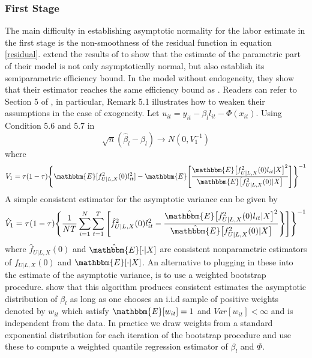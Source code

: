 \documentclass[11pt]{article}
\begin{document}
\subsubsection*{First Stage}
The main difficulty in establishing asymptotic normality for the labor estimate in the first stage is the non-smoothness of the residual function in equation \eqref{residual}. \cite{Chen2009} extend the results of \cite{Ai2003} to show that the estimate of the parametric part of their model is not only asymptotically normal, but also establish its semiparametric efficiency bound. In the model without endogeneity, they show that their estimator reaches the same efficiency bound as \cite{Lee2003}. Readers can refer to Section 5 of \cite{Chen2009}, in particular, Remark 5.1 illustrates how to weaken their assumptions in the case of exogeneity. Let $u_{it}=y_{it}-\beta_{l}l_{it}-\Phi(x_{it})$. Using Condition 5.6 and 5.7 in \cite{Chen2009}
\begin{equation}
\sqrt{n}(\hat{\beta}_{l}-\beta_{l})\rightarrow N(0, V_{1}^{-1})
\end{equation}
where
\begin{equation}
V_{1}=\tau(1-\tau)\Bigg\{\mathbbm{E}[f^{2}_{U|L,X}(0)l^{2}_{it}]-\mathbbm{E}\Bigg[\frac{\mathbbm{E}\big[f^{2}_{U|L,X}(0)l_{it}|X\big]^{2}}{\mathbbm{E}\big[f^{2}_{U|L,X}(0)|X\big]}\Bigg]\Bigg\}^{-1}
\end{equation}
A simple consistent estimator for the asymptotic variance can be given by
\begin{equation}
\hat{V}_{1}=\tau(1-\tau)\Bigg\{\frac{1}{NT}\sum_{i=1}^{N}\sum_{t=1}^{T}\Bigg[\hat{f}^{2}_{U|L,X}(0)l_{it}^{2}-\frac{\hat{\mathbbm{E}}\big[f^{2}_{U|L,X}(0)l_{it}|X\big]^{2}}{\hat{\mathbbm{E}}\big[f^{2}_{U|L,X}(0)|X\big]}\Bigg\}\Bigg]\Bigg\}^{-1}
\end{equation}
where $\hat{f}_{U|L,X}(0)$ and $\hat{\mathbbm{E}}[\cdot|X]$ are consistent nonparametric estimators of $f_{U|L,X}(0)$ and $\mathbbm{E}[\cdot|X]$. An alternative to plugging in these into the estimate of the asymptotic variance, is to use a weighted bootstrap procedure. \cite{Chen2009} show that this algorithm produces consistent estimates the asymptotic distribution of $\beta_{l}$ as long as one chooses an i.i.d sample of positive weights denoted by $w_{it}$ which satisfy $\mathbbm{E}[w_{it}]=1$ and $Var[w_{it}]<\infty$ and is independent from the data. In practice we draw weights from a standard exponential distribution for each iteration of the bootstrap procedure and use these to compute a weighted quantile regression estimator of $\beta_{l}$ and $\Phi$.
\end{document}
